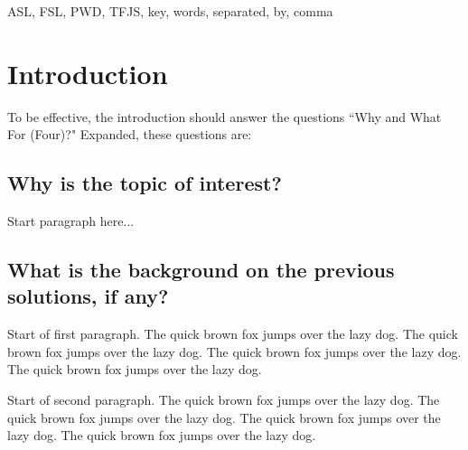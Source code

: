 \documentclass[journal]{./IEEE/IEEEtran}
\title{\SPTITLE}
\author{\ADVISEE~and~\ADVISER%
\REMARK
}
\begin{document}
\maketitle

\begin{abstract}
The abstract should be \textit{informational}. Typically a single paragraph
of about fifty to two hundred workds, the abstract allows your readers to judge
whether or not the article is of relevance to them. It should therefore be
a concise summary of the aims, scope, and conclusions of your work. There
is no space for unnecessary texts; an abstract should be kept to as few words
as possible while remaining reasonably informative. Irrelevancies, such as
minor details or a \textit{description} of the structure of the paper, are 
inappropriate, as are acronyms, abbreviations, and mathematics. Sentences such
as ``we review relevant literature" should be omitted.\cite{Zobel97}
\end{abstract}

\begin{keywords}
ASL, FSL, PWD, TFJS, key, words, separated, by, comma
\end{keywords}

\section{Introduction}
To be effective, the introduction should answer the questions ``Why and What For (Four)?" Expanded, these questions are:\cite{Papadakis83}

\subsection{Why is the topic of interest?}
Start paragraph here...

\subsection{What is the background on the previous solutions, if any?}
Start of first paragraph. The quick brown fox jumps over the lazy dog. The quick
brown fox jumps over the lazy dog. The quick brown fox jumps over the lazy dog. The
quick brown fox jumps over the lazy dog.

Start of second paragraph. The quick brown fox jumps over the lazy dog. The quick
brown fox jumps over the lazy dog. The quick brown fox jumps over the lazy dog. The
quick brown fox jumps over the lazy dog.
\end{document}
